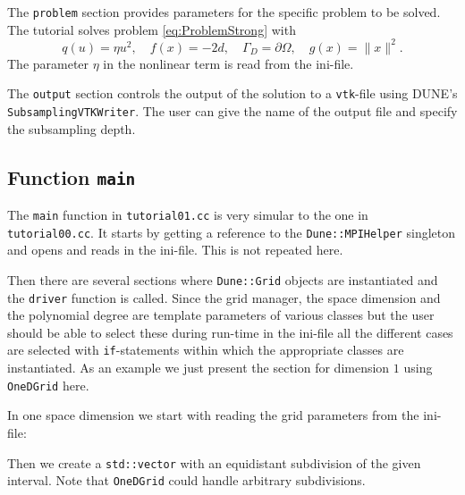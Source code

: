 \documentclass[a4paper,12pt]{article}
\begin{document}

The \lstinline{problem} section provides parameters for the
specific problem to be solved. The tutorial solves problem \eqref{eq:ProblemStrong}
with $$q(u)=\eta u^2, \quad f(x) = -2d, \quad \Gamma_D=\partial\Omega,
\quad g(x)=\|x\|^2 .$$
The parameter $\eta$ in the nonlinear term is read from the ini-file.


The \lstinline{output} section controls the output of the solution
to a \lstinline{vtk}-file using DUNE's \lstinline{SubsamplingVTKWriter}.
The user can give the name of the output file and specify the subsampling depth.

\subsection{Function \lstinline{main}}

The \lstinline{main} function  in \lstinline{tutorial01.cc} is very simular to the one
in \lstinline{tutorial00.cc}. It starts by getting a reference to the
\lstinline{Dune::MPIHelper} singleton and opens and reads in the ini-file. 
This is not repeated here.

Then there are several sections where \lstinline{Dune::Grid} objects are instantiated
and the \lstinline{driver} function is called. Since the grid manager, the space
dimension and the polynomial degree are template parameters of various classes
but the user should be able to select these during run-time in the ini-file all 
the different cases are selected with \lstinline{if}-statements within which
the appropriate classes are instantiated. As an example we just
present the section for dimension $1$ using \lstinline{OneDGrid} here.

In one space dimension we start with reading the grid parameters 
from the ini-file:


Then we create a \lstinline{std::vector} with an equidistant
subdivision of the given interval. Note that \lstinline{OneDGrid}
could handle arbitrary subdivisions.

\end{document}
